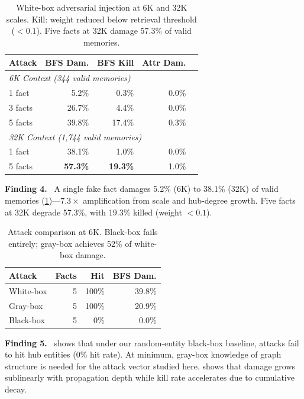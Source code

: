\documentclass{article}
\newcommand{\finding}[1]{\vspace{2pt}\noindent\textbf{Finding #1.}~}
\begin{document}
\begin{table}[htbp]
\centering
\footnotesize
\begin{tabular}{lrrrr}
\toprule
\textbf{Attack} & \textbf{BFS Dam.} & \textbf{BFS Kill} & \textbf{Attr Dam.} \\
\midrule
\multicolumn{4}{l}{\textit{6K Context (344 valid memories)}} \\
1 fact & 5.2\% & 0.3\% & 0.0\% \\
3 facts & 26.7\% & 4.4\% & 0.0\% \\
5 facts & 39.8\% & 17.4\% & 0.3\% \\
\midrule
\multicolumn{4}{l}{\textit{32K Context (1,744 valid memories)}} \\
1 fact & 38.1\% & 1.0\% & 0.0\% \\
5 facts & \textbf{57.3\%} & \textbf{19.3\%} & 1.0\% \\
\bottomrule
\end{tabular}
\caption{White-box adversarial injection at 6K and 32K scales. Kill: weight reduced below retrieval threshold ($< 0.1$). Five facts at 32K damage 57.3\% of valid memories.}
\label{tab:adversarial}
\end{table}

\finding{4} A single fake fact damages 5.2\% (6K) to 38.1\% (32K) of valid memories (\cref{tab:adversarial})---$7.3\times$ amplification from scale and hub-degree growth.
Five facts at 32K degrade 57.3\%, with 19.3\% killed (weight $< 0.1$).

\begin{table}[htbp]
\centering
\footnotesize
\begin{tabular}{lrrr}
\toprule
\textbf{Attack} & \textbf{Facts} & \textbf{Hit} & \textbf{BFS Dam.} \\
\midrule
White-box & 5 & 100\% & 39.8\% \\
Gray-box & 5 & 100\% & 20.9\% \\
Black-box & 5 & 0\% & 0.0\% \\
\bottomrule
\end{tabular}
\caption{Attack comparison at 6K. Black-box fails entirely; gray-box achieves 52\% of white-box damage.}
\label{tab:blackbox}
\end{table}

\finding{5}  shows that under our random-entity black-box baseline, attacks fail to hit hub entities (0\% hit rate).
At minimum, gray-box knowledge of graph structure is needed for the attack vector studied here.
 shows that damage grows sublinearly with propagation depth while kill rate accelerates due to cumulative decay.
\end{document}
